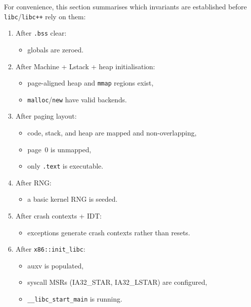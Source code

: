 \documentclass[a4paper,11pt]{article}
\begin{document}
For convenience, this section summarises which invariants are
established before \texttt{libc}/\texttt{libc++} rely on them:

\begin{enumerate}
  \item After \texttt{.bss} clear:
    \begin{itemize}
      \item globals are zeroed.
    \end{itemize}

  \item After Machine + Lstack + heap initialisation:
    \begin{itemize}
      \item page-aligned heap and \texttt{mmap} regions exist,
      \item \texttt{malloc}/\texttt{new} have valid backends.
    \end{itemize}

  \item After paging layout:
    \begin{itemize}
      \item code, stack, and heap are mapped and non-overlapping,
      \item page~0 is unmapped,
      \item only \texttt{.text} is executable.
    \end{itemize}

  \item After RNG:
    \begin{itemize}
      \item a basic kernel RNG is seeded.
    \end{itemize}

  \item After crash contexts + IDT:
    \begin{itemize}
      \item exceptions generate crash contexts rather than resets.
    \end{itemize}

  \item After \texttt{x86::init\_libc}:
    \begin{itemize}
      \item auxv is populated,
      \item syscall MSRs (IA32\_STAR, IA32\_LSTAR) are configured,
      \item \texttt{\_\_libc\_start\_main} is running.
    \end{itemize}


\end{enumerate}
\end{document}
